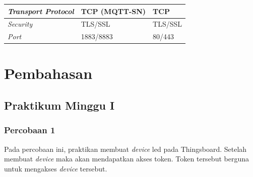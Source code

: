 \documentclass{class}
\begin{document}
\begin{table}[H]
\begin{tabular}{|l|l|l|}
  \emph{Transport Protocol  }                                     & TCP (MQTT-SN)                                                                                          & TCP                                                                                                    \\ \hline
  \emph{Security            }                                     & TLS/SSL                                                                                                & TLS/SSL                                                                                                \\ \hline
  \emph{Port                }                                     & 1883/8883                                                                                              & 80/443                                                                                                 \\ \hline
  \end{tabular}
  \end{table} 

    \chapter{Pembahasan}
  \section{Praktikum Minggu I}
    \subsection{Percobaan 1}
    Pada percobaan ini, praktikan membuat \emph{device} led pada Thingsboard.
    Setelah membuat \emph{device} maka akan mendapatkan akses token.
    Token tersebut berguna untuk mengakses \emph{device} tersebut.
\end{document}
